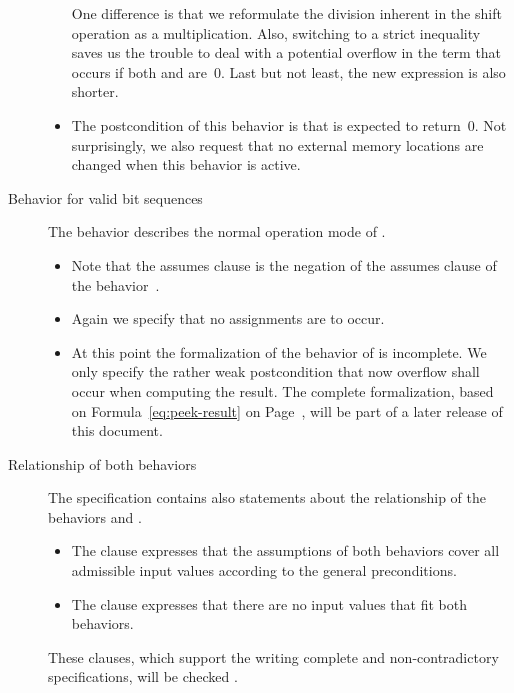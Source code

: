 \begin{description}
\begin{itemize}
One difference is that we reformulate the division inherent in the shift
operation as a multiplication.
Also, switching to a strict inequality saves us the trouble
to deal with a potential overflow in the term 
that occurs if both  and  are~0.
Last but not least, the new expression is also shorter.

\item
The postcondition of this behavior is that \peek is expected to return~0.
Not surprisingly, we also request that no external memory locations are
changed when this behavior is active.

\end{itemize}

\item[Behavior for valid bit sequences]

The behavior  describes the normal operation mode of \peek.
\begin{itemize}
\item
Note that the assumes clause is the negation of the assumes clause  of
the behavior~.

\item
Again we specify that no assignments are to occur.

\item 
At this point the formalization of the behavior of \peek is incomplete.
We only specify the rather weak postcondition that now overflow shall occur
when computing the result.
The complete formalization, based on Formula~\eqref{eq:peek-result}
on Page~\pageref{eq:peek-result}, will be part of a later release of this document.
\end{itemize}

\item[Relationship of both behaviors]

The specification contains also statements about the relationship
of the behaviors  and .

\begin{itemize}
\item
The clause  expresses that
the assumptions of both behaviors cover all admissible 
input values according to the general preconditions.

\item
The clause  expresses
that there are no input values that fit both 
behaviors.
\end{itemize}

These clauses, which support the writing complete and non-contradictory specifications,
will be checked \framacwp.
\end{description}

